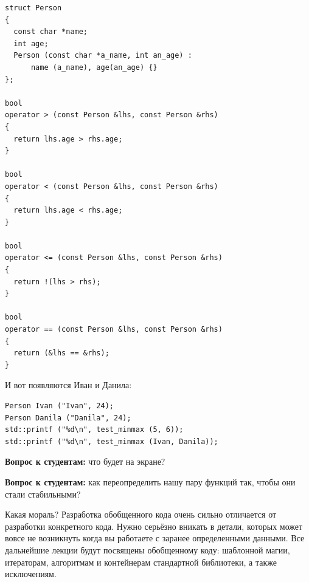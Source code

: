 \documentclass[a4paper,12pt,oneside]{article}
\newif\ifanswers
\begin{document}
\begin{lstlisting}
struct Person
{
  const char *name;
  int age;
  Person (const char *a_name, int an_age) : 
      name (a_name), age(an_age) {}
};

bool
operator > (const Person &lhs, const Person &rhs)
{
  return lhs.age > rhs.age;
}

bool
operator < (const Person &lhs, const Person &rhs)
{
  return lhs.age < rhs.age;
}

bool
operator <= (const Person &lhs, const Person &rhs)
{
  return !(lhs > rhs);
}

bool
operator == (const Person &lhs, const Person &rhs)
{
  return (&lhs == &rhs);
}
\end{lstlisting}

И вот появляются Иван и Данила:

\begin{lstlisting}
Person Ivan ("Ivan", 24);
Person Danila ("Danila", 24);
std::printf ("%d\n", test_minmax (5, 6));
std::printf ("%d\n", test_minmax (Ivan, Danila));
\end{lstlisting}

\textbf{Вопрос к студентам:} что будет на экране?

\ifanswers
Неожиданно на экране будет 1 и 0. Такое поведение функций, когда для пары одинаковых объектов они сохраняют их значения и порядок в результирующей паре, называется стабильностью. Можно сделать вывод, что функции \lstinline!min! и \lstinline!max! ведут себя \textbf{нестабильно}. Проблемы стабильности также возникают при проектировании обобщённых алгоритмов сортировки, бинарного поиска и многих других.
\fi

\textbf{Вопрос к студентам:} как переопределить нашу пару функций так, чтобы они стали стабильными?

\ifanswers
Один из вариантов решения

\begin{lstlisting}
template <class T> const T&
max (const T &x, const T &y)
{
  return ((x > y) ? x : y);
}

template <class T> const T&
min (const T &x, const T &y)
{
  return ((x <= y) ? x : y);
}
\end{lstlisting}
\fi

Какая мораль? Разработка обобщенного кода очень сильно отличается от разработки конкретного кода. Нужно серьёзно вникать в детали, которых может вовсе не возникнуть когда вы работаете с заранее определенными данными. Все дальнейшие лекции будут посвящены обобщенному коду: шаблонной магии, итераторам, алгоритмам и контейнерам стандартной библиотеки, а также исключениям. 
\end{document}
